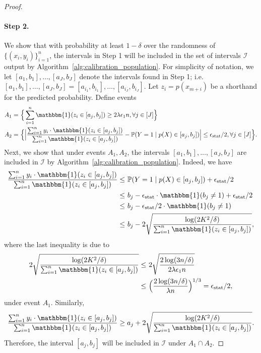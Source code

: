 \documentclass[11pt]{article}
\theoremstyle{statplain}
\theoremstyle{statdefinition}
\newcommand{\stat}{\mathrm{stat}}
\newcommand{\sumin}{\sum_{i=1}^n}
\newcommand{\PP}{\mathbb{P}}
\newcommand{\0}{\mathbf{0}}
\newcommand{\I}{\mathcal{I}}
\newcommand{\estModel}{p} %
\begin{document}
\begin{proof}
\paragraph{Step 2. } 
We show that with probability at least $1-\delta$ over the randomness of $\{(x_i,y_i)\}_{i=1}^n$, the intervals in Step 1 will be included in the set of intervals $\I$ output by Algorithm~\ref{alg:calibration_population}. 
For simplicity of notation, we let $[a_{1},b_{1}],\dots,[a_J,b_J]$ denote the intervals found in Step 1; i.e. $[a_{1},b_{1}],\dots,[a_J,b_J] = [a_{i_1},b_{i_1}],\dots,[a_{i_J},b_{i_J}]$. Let $z_i = p(x_{m+i})$ be a shorthand for the predicted probability.
Define events
\begin{align*}
    A_1 = &~ \Big\{\sumin \mathbbm{1}(z_i \in [a_j,b_j]) \geq 2\lambda \epsilon_1 n,\forall j \in [J]\Big\}\\
    A_2 = &~ \Big\{\Big|\frac{\sum_{i=1}^n y_i \cdot \mathbbm{1}(z_i \in [a_j,b_j])}{\sum_{i=1}^n \mathbbm{1}(z_i \in [a_j,b_j])} - \PP(Y=1\mid \estModel(X) \in [a_j,b_j])\Big| \leq \epsilon_\stat/2, \forall j \in [J]\Big\}.
\end{align*}
Next, we show that under events $A_1, A_2$, the intervals $[a_{1},b_{1}],\dots,[a_J,b_J]$ are included in $\I$ by Algorithm~\ref{alg:calibration_population}. 
Indeed, we have
\begin{align*}
    \frac{\sum_{i=1}^n y_i \cdot \mathbbm{1}(z_i \in [a_j,b_j])}{\sum_{i=1}^n \mathbbm{1}(z_i \in [a_j,b_j])} \leq &~ \PP(Y=1\mid\estModel(X) \in [a_j,b_j]) + \epsilon_\stat/2\\
    \leq &~ b_{j} - \epsilon_\stat \cdot \mathbbm{1}(b_{j} \neq 1) + \epsilon_\stat/2\\
    \leq &~  b_{j} - \epsilon_\stat/2 \cdot \mathbbm{1}(b_{j} \neq 1)\\
    \leq &~ b_j - 2\sqrt{\frac{\log (2K^2/\delta)}{\sum_{i=1}^n \mathbbm{1}(z_i \in [a_j,b_j])}},
\end{align*}
where the last inequality is due to
\begin{align*}
    2\sqrt{\frac{\log (2K^2/\delta)}{\sum_{i=1}^n \mathbbm{1}(z_i \in [a_j,b_j])}} \leq &~ 2\sqrt{\frac{2\log(3n/\delta)}{2\lambda \epsilon_1 n}}\\
    \leq &~ \Big(\frac{2\log(3n/\delta)}{\lambda n}\Big)^{1/3} = \epsilon_\stat/2,
\end{align*}
under event $A_1$. 
Similarly,
\begin{align*}
    \frac{\sum_{i=1}^n y_i \cdot \mathbbm{1}(z_i \in [a_j,b_j])}{\sum_{i=1}^n \mathbbm{1}(z_i \in [a_j,b_j])} \geq a_j + 2\sqrt{\frac{\log (2K^2/\delta)}{\sum_{i=1}^n \mathbbm{1}(z_i \in [a_j,b_j])}}.
\end{align*}
Therefore, the interval $[a_j,b_j]$ will be included in $\I$ under $A_1 \cap A_2$. 


\end{proof}
\end{document}
